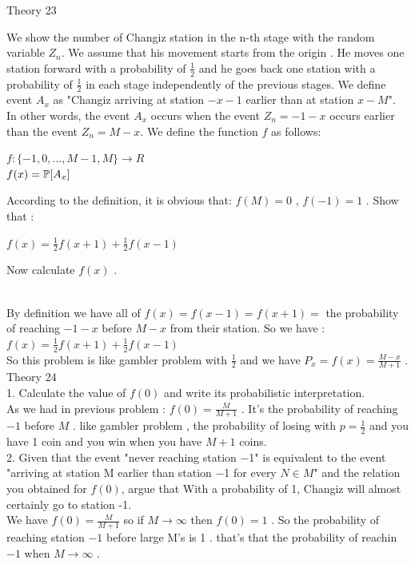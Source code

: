 \documentclass[30pt]{article}
\begin{document}
{\Large \color{blue} Theory 23 } \\
{\color{blue} We show the number of Changiz station in the n-th stage with the random variable $Z_n$. We assume that his movement starts from the origin . He moves one station forward with a probability of $\frac{1}{2}$ and he goes back one station with a probability of $\frac{1}{2}$ in each stage independently of the previous stages. We define event $A_x$ as "Changiz arriving at station $-x-1$ earlier than at station $x − M$". In other words, the event $A_x$ occurs when the event $Z_n = -1 -x $ occurs earlier than the event $Z_n = M - x $. We define the function $f$ as follows:
\begin{center}
    $f : \{ -1,0,...,M-1,M \} \to R $ \\
    $f(x) = \Bbb{P}[A_x] $
\end{center} 
According to the definition, it is obvious that: $f(M) = 0 $ , $f(-1) = 1 $ . Show that : 
\begin{center}
    $f(x) = \frac{1}{2}f(x+1) + \frac{1}{2}f(x-1) $
\end{center} 
Now calculate $f(x)$ . 
} \\ \newline 
By definition we have all of $f(x) = f(x-1) = f(x+1) = $ the probability of reaching $-1-x $ before $M-x $ from their station. So we have : $f(x) = \frac{1}{2}f(x+1) + \frac{1}{2}f(x-1) $ \\ So this problem is like gambler problem with $\frac{1}{2} $ and we have $P_x = f(x) = \frac{M-x}{M+1} $ . \\

{\Large \color{blue} Theory 24 } \\
{\color{blue} {\large 1. }Calculate the value of $f(0)$ and write its probabilistic interpretation. } \\ \newline
As we had in previous problem : $f(0) = \frac{M}{M+1}$ . It's the probability of reaching $-1$ before $M$ . like gambler problem , the probability of losing with $p = \frac{1}{2}$ and you have 1 coin and you win when you have $M+1$ coins. \\ 

{\color{blue} {\large 2. }Given that the event "never reaching station −1" is equivalent to the event "arriving at station M earlier than station −1 for every $N \in M$" and the relation you obtained for $f(0)$, argue that With a probability of 1, Changiz will almost certainly go to station -1. } \\ \newline
We have $f(0) = \frac{M}{M+1}$ so if $M \to \infty $ then $f(0) = 1 $ . So the probability of reaching station $-1$ before large M's is 1 . that's that the probability of reachin $-1$ when $M \to \infty$ . \\ 
\end{document}
